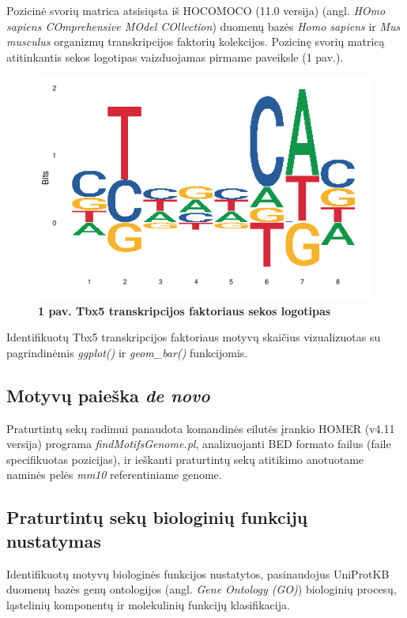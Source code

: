 \documentclass[12pt]{article}
\begin{document}
Pozicinė svorių matrica atsisiųsta iš HOCOMOCO\cite{HOCOMOCO} (11.0 versija)
(angl. \emph{HOmo sapiens COmprehensive MOdel COllection}) duomenų bazės
\emph{Homo sapiens} ir \emph{Mus musculus} organizmų transkripcijos faktorių
kolekcijos. Pozicinę svorių matricą atitinkantis sekos logotipas vaizduojamas
pirmame paveiksle (1 pav.).

\begin{figure}[htb]
    \begin{center}
        \includegraphics[width=0.4\linewidth]{../Figures/tbx5_motif.png}
        \vspace{-2\baselineskip}
        \caption*{\small\textbf{1 pav. Tbx5 transkripcijos faktoriaus
                                sekos logotipas}}
    \end{center}
\end{figure}

Identifikuotų Tbx5 transkripcijos faktoriaus motyvų skaičius vizualizuotas su
pagrindinėmis \emph{ggplot()} ir \emph{geom\_bar()} funkcijomis.

\subsection{Motyvų paieška \emph{de novo}}
Praturtintų sekų radimui panaudota komandinės eilutės įrankio HOMER\cite{HOMER}
(v4.11 versija) programa \emph{findMotifsGenome.pl}, analizuojanti BED formato
failus (faile specifikuotas pozicijas), ir ieškanti praturtintų sekų atitikimo
anotuotame naminės pelės \emph{mm10} referentiniame genome.

\subsection{Praturtintų sekų biologinių funkcijų nustatymas}
Identifikuotų motyvų biologinės funkcijos nustatytos, pasinaudojus
UniProtKB\cite{UNIPROT} duomenų bazės genų ontologijos (angl. \emph{Gene
Ontology (GO)}) biologinių procesų, ląstelinių komponentų ir molekulinių
funkcijų klasifikacija.
\end{document}
